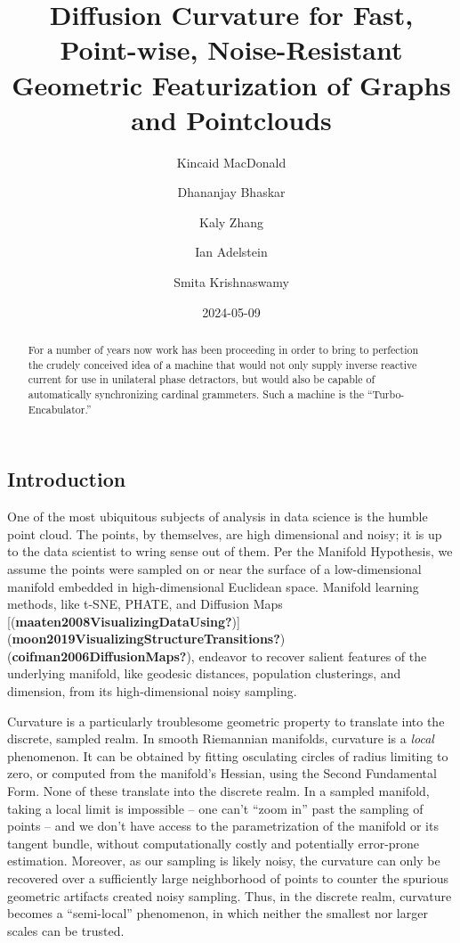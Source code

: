 \documentclass[
  letterpaper,
  DIV=11,
  numbers=noendperiod]{scrartcl}
\title{Diffusion Curvature for Fast, Point-wise, Noise-Resistant
Geometric Featurization of Graphs and Pointclouds}
\author{Kincaid MacDonald \and Dhananjay Bhaskar \and Kaly
Zhang \and Ian Adelstein \and Smita Krishnaswamy}
\date{2024-05-09}
\begin{document}
\maketitle
\begin{abstract}
For a number of years now work has been proceeding in order to bring to
perfection the crudely conceived idea of a machine that would not only
supply inverse reactive current for use in unilateral phase detractors,
but would also be capable of automatically synchronizing cardinal
grammeters. Such a machine is the ``Turbo-Encabulator.''
\end{abstract}

\subsection{Introduction}\label{introduction}

One of the most ubiquitous subjects of analysis in data science is the
humble point cloud. The points, by themselves, are high dimensional and
noisy; it is up to the data scientist to wring sense out of them. Per
the Manifold Hypothesis, we assume the points were sampled on or near
the surface of a low-dimensional manifold embedded in high-dimensional
Euclidean space. Manifold learning methods, like t-SNE, PHATE, and
Diffusion Maps
{[}(\textbf{maaten2008VisualizingDataUsing?}){]}(\textbf{moon2019VisualizingStructureTransitions?})(\textbf{coifman2006DiffusionMaps?}),
endeavor to recover salient features of the underlying manifold, like
geodesic distances, population clusterings, and dimension, from its
high-dimensional noisy sampling.

Curvature is a particularly troublesome geometric property to translate
into the discrete, sampled realm. In smooth Riemannian manifolds,
curvature is a \emph{local} phenomenon. It can be obtained by fitting
osculating circles of radius limiting to zero, or computed from the
manifold's Hessian, using the Second Fundamental Form. None of these
translate into the discrete realm. In a sampled manifold, taking a local
limit is impossible -- one can't ``zoom in'' past the sampling of points
-- and we don't have access to the parametrization of the manifold or
its tangent bundle, without computationally costly and potentially
error-prone estimation. Moreover, as our sampling is likely noisy, the
curvature can only be recovered over a sufficiently large neighborhood
of points to counter the spurious geometric artifacts created noisy
sampling. Thus, in the discrete realm, curvature becomes a
``semi-local'' phenomenon, in which neither the smallest nor larger
scales can be trusted.
\end{document}
